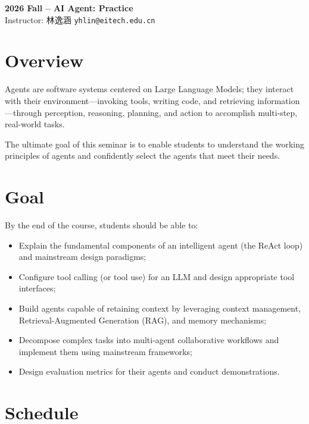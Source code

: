 \documentclass[12pt]{ctexart}
\newcommand{\coursecode}{2026 Fall}
\newcommand{\coursename}{AI Agent: Practice}
\begin{document}
\pagestyle{empty}

\begin{center}
  {\LARGE\bfseries \coursecode{} -- \coursename}\\[0.4em]
  {\small Instructor: 林逸涵 \texttt{yhlin@eitech.edu.cn}}
\end{center}
\vspace{0.25em}

\section{Overview}

Agents are software systems centered on Large Language Models; they interact with their environment---invoking tools, writing code, and retrieving information---through perception, reasoning, planning, and action to accomplish multi-step, real-world tasks.

The ultimate goal of this seminar is to enable students to understand the working principles of agents and confidently select the agents that meet their needs.

\section{Goal}

By the end of the course, students should be able to:

\begin{itemize}
  \item Explain the fundamental components of an intelligent agent (the ReAct loop) and mainstream design paradigms;
  \item Configure tool calling (or tool use) for an LLM and design appropriate tool interfaces;
  \item Build agents capable of retaining context by leveraging context management, Retrieval-Augmented Generation (RAG), and memory mechanisms;
  \item Decompose complex tasks into multi-agent collaborative workflows and implement them using mainstream frameworks;
  \item Design evaluation metrics for their agents and conduct demonstrations.
\end{itemize}

\section{Schedule}
\end{document}
